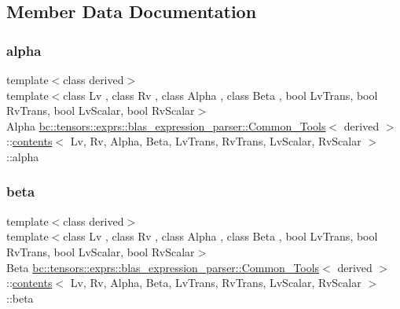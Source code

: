 \subsection{Member Data Documentation}
\mbox{\label{structbc_1_1tensors_1_1exprs_1_1blas__expression__parser_1_1Common__Tools_1_1contents_af312ac58c9704b1df5552e2884e163c7}} 
\subsubsection{\texorpdfstring{alpha}{alpha}}
{\footnotesize\ttfamily template$<$class derived$>$ \\
template$<$class Lv , class Rv , class Alpha , class Beta , bool Lv\+Trans, bool Rv\+Trans, bool Lv\+Scalar, bool Rv\+Scalar$>$ \\
Alpha \hyperlink{structbc_1_1tensors_1_1exprs_1_1blas__expression__parser_1_1Common__Tools}{bc\+::tensors\+::exprs\+::blas\+\_\+expression\+\_\+parser\+::\+Common\+\_\+\+Tools}$<$ derived $>$\+::\hyperlink{structbc_1_1tensors_1_1exprs_1_1blas__expression__parser_1_1Common__Tools_1_1contents}{contents}$<$ Lv, Rv, Alpha, Beta, Lv\+Trans, Rv\+Trans, Lv\+Scalar, Rv\+Scalar $>$\+::alpha}

\mbox{\label{structbc_1_1tensors_1_1exprs_1_1blas__expression__parser_1_1Common__Tools_1_1contents_abdbb20da7426295ede058497a1999566}} 
\subsubsection{\texorpdfstring{beta}{beta}}
{\footnotesize\ttfamily template$<$class derived$>$ \\
template$<$class Lv , class Rv , class Alpha , class Beta , bool Lv\+Trans, bool Rv\+Trans, bool Lv\+Scalar, bool Rv\+Scalar$>$ \\
Beta \hyperlink{structbc_1_1tensors_1_1exprs_1_1blas__expression__parser_1_1Common__Tools}{bc\+::tensors\+::exprs\+::blas\+\_\+expression\+\_\+parser\+::\+Common\+\_\+\+Tools}$<$ derived $>$\+::\hyperlink{structbc_1_1tensors_1_1exprs_1_1blas__expression__parser_1_1Common__Tools_1_1contents}{contents}$<$ Lv, Rv, Alpha, Beta, Lv\+Trans, Rv\+Trans, Lv\+Scalar, Rv\+Scalar $>$\+::beta}

